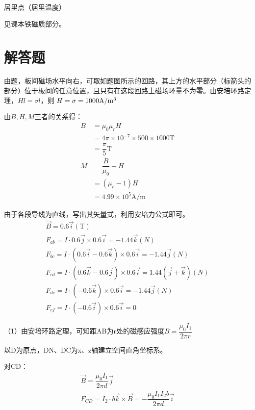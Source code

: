 \documentclass[b5paper,opensource]{./template/qyxf-book}
\begin{document}
居里点（居里温度）

\solve
见课本铁磁质部分。

\section{解答题}


\solve
由题，板间磁场水平向右，可取如题图所示的回路，其上方的水平部分（标箭头的部分）位于板间的任意位置，且只有在这段回路上磁场环量不为零。由安培环路定理，$Hl=\sigma l$，则
$H=\sigma=1000 \textrm{A/m}\footnotemark[3]$

由$B,H,M$三者的关系得：
\begin{align*}
		B&=\mu_0\mu_rH\\
		&=4\pi\times 10^{-7}\times 500\times 1000 \textrm{T}\\
		&=\dfrac{\pi}{5} \textrm{T}\\	
		M&=\dfrac{B}{\mu_0}-H\\
		&=(\mu_r-1)H\\
		&=4.99\times 10^5 \textrm{A/m}
\end{align*}


\solve
由于各段导线为直线，写出其矢量式，利用安培力公式即可\footnotemark[4]。
\begin{gather*}
	\vec{B}=0.6\vec{i}(\textrm{T})\\
	F_{ab}=I\cdot 0.6\vec{j}\times 0.6\vec{i}=-1.44\vec{k}(N)\\
	F_{bc}=I\cdot (0.6\vec{i}-0.6\vec{k})\times 0.6\vec{i}=-1.44\vec{j}(N)\\
	F_{cd}=I\cdot (0.6\vec{k}-0.6\vec{j})\times 0.6\vec{i}=1.44(\vec{j}+\vec{k})(N)\\
	F_{de}=I\cdot (-0.6\vec{k})\times 0.6\vec{i}=-1.44\vec{j}(N)\\
	F_{ef}=I\cdot (-0.6\vec{i})\times 0.6\vec{i}=0
\end{gather*}


\solve
（1）由安培环路定理，可知距AB为r处的磁感应强度$B=\dfrac{\mu_0I_1}{2\pi r}$

以D为原点，DN、DC为x、z轴建立空间直角坐标系。

对CD：
\begin{gather*}
	\vec{B}=\dfrac{\mu_0I_1}{2\pi d}\vec{j}\\
	F_{CD}=I_2\cdot b\vec{k}\times \vec{B}=-\dfrac{\mu_0I_1I_2b}{2\pi d}\vec{i}
\end{gather*}
\end{document}
